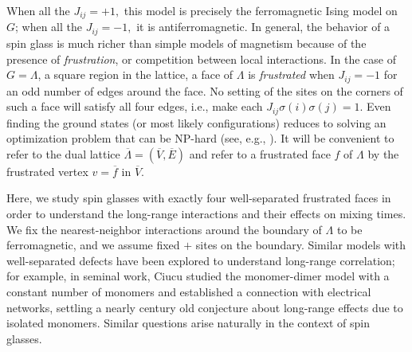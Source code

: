 \documentclass[letterpaper,english,numberwithinsect]{amsart}
\newcommand{\Z}{\ensuremath{\mathbb Z}}
\begin{document}
When all the $J_{ij}=+1,$ this model is precisely the ferromagnetic Ising model on $G$; when all the $J_{ij}=-1,$ it is  antiferromagnetic.  In general, the behavior of a spin glass is much richer than simple models of magnetism because of the presence of {\it frustration}, or  competition between local interactions. 
In the case of $G = \Lambda$, a square region in the lattice, a face of $\Lambda$ is {\it frustrated} when $J_{ij}=-1$ for an odd number of edges around the face. No setting of the sites on the corners of such a face will satisfy all four edges, i.e., make each $J_{ij} \sigma(i)\sigma(j) = 1$. Even finding the ground states (or most likely configurations) reduces to solving an optimization problem that can be NP-hard (see, e.g., \cite{baharona}).  It will be convenient to refer to the dual lattice $\overline{\Lambda}=(\overline{V}, \overline{E})$ and refer to a frustrated face $f$ of $\Lambda$ by the frustrated vertex $v = \overline{f}$ in $\overline{V}$.  

Here, we study spin glasses with exactly four well-separated frustrated faces in order to understand the long-range interactions and their effects on mixing times.  We fix the nearest-neighbor interactions around the boundary of $\Lambda$ to be ferromagnetic, and we assume fixed $+$ sites on the boundary. 
Similar models with well-separated defects have been explored to understand long-range correlation; for example, in seminal work, Ciucu \cite{ciucu} studied the monomer-dimer model with a constant number of monomers and established a connection with electrical networks, settling a nearly century old conjecture about long-range effects due to isolated monomers.  
Similar questions arise naturally in the context of spin glasses.
\end{document}

